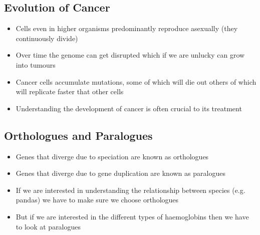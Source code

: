 
\begin{slide}
\section{Evolution of Cancer}

\begin{PauseHighLight}
  \begin{itemize}
  \item Cells even in higher organisms predominantly reproduce asexually
    (they continuously divide)\pause
  \item Over time the genome can get disrupted which if we are unlucky
    can grow into tumours\pause
  \item Cancer cells accumulate mutations, some of which will die out
    others of which will replicate faster that other cells\pause
  \item Understanding the development of cancer is often crucial to its
    treatment\pause
  \end{itemize}
\end{PauseHighLight}

\end{slide}


\begin{slide}
\section{Orthologues and Paralogues}

\begin{PauseHighLight}
  \begin{itemize}
  \item Genes that diverge due to speciation are known as
    orthologues\pause
  \item Genes that diverge due to gene duplication are known as
    paralogues\pause
  \item If we are interested in understanding the relationship between
    species (e.g. pandas) we have to make sure we choose
    orthologues\pause
  \item But if we are interested in the different types of haemoglobins
    then we have to look at paralogues\pause
  \end{itemize}
\end{PauseHighLight}


\end{slide}

